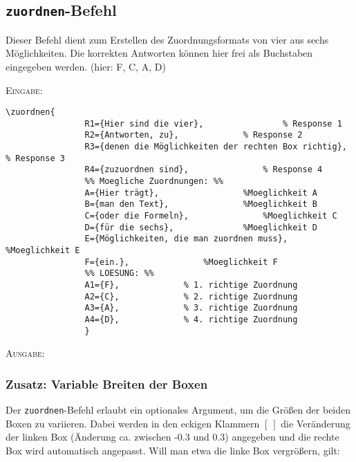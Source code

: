 \documentclass[a4paper,12pt]{article}
\begin{document}
\subsection{\texttt{zuordnen}-Befehl}
Dieser Befehl dient zum Erstellen des Zuordnungsformats von vier aus sechs Möglichkeiten.
Die korrekten Antworten können hier frei als Buchstaben eingegeben werden. (hier: F, C, A, D)

\leer

\textsc{Eingabe:}
\begin{verbatim}
\zuordnen{
				R1={Hier sind die vier},				% Response 1
				R2={Antworten, zu},				% Response 2
				R3={denen die Möglichkeiten der rechten Box richtig},				% Response 3
				R4={zuzuordnen sind},				% Response 4
				%% Moegliche Zuordnungen: %%
				A={Hier trägt}, 				%Moeglichkeit A  
				B={man den Text}, 				%Moeglichkeit B  
				C={oder die Formeln}, 				%Moeglichkeit C  
				D={für die sechs}, 				%Moeglichkeit D  
				E={Möglichkeiten, die man zuordnen muss}, 				%Moeglichkeit E  
				F={ein.}, 				%Moeglichkeit F  
				%% LOESUNG: %%
				A1={F},				% 1. richtige Zuordnung
				A2={C},				% 2. richtige Zuordnung
				A3={A},				% 3. richtige Zuordnung
				A4={D},				% 4. richtige Zuordnung
				}
\end{verbatim}
\leer

\textsc{Ausgabe:}


\subsubsection{Zusatz: Variable Breiten der Boxen}

Der \texttt{zuordnen}-Befehl erlaubt ein optionales Argument, um die Größen der beiden Boxen zu variieren. Dabei werden in den eckigen Klammern $[~]$ die Veränderung der linken Box (Änderung ca. zwischen -0.3 und 0.3) angegeben und die rechte Box wird automatisch angepasst. Will man etwa die linke Box vergrößern, gilt:  
 
\end{document}
